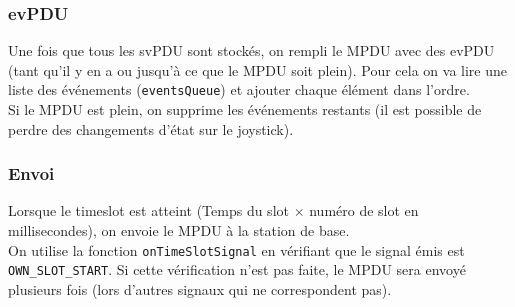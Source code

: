 \documentclass[DeseNET_Sebastien_Deriaz]{subfiles}
\begin{document}
\subsubsection{evPDU}
Une fois que tous les svPDU sont stockés, on rempli le MPDU avec des evPDU (tant qu'il y en a ou jusqu'à ce que le MPDU soit plein). Pour cela on va lire une liste des événements (\verb!eventsQueue!) et ajouter chaque élément dans l'ordre.\\
Si le MPDU est plein, on supprime les événements restants (il est possible de perdre des changements d'état sur le joystick).
\subsubsection{Envoi}
Lorsque le timeslot est atteint (Temps du slot $\times$ numéro de slot en millisecondes), on envoie le MPDU à la station de base.\\
On utilise la fonction \verb!onTimeSlotSignal! en vérifiant que le signal émis est \verb!OWN_SLOT_START!. Si cette vérification n'est pas faite, le MPDU sera envoyé plusieurs fois (lors d'autres signaux qui ne correspondent pas).
\end{document}

